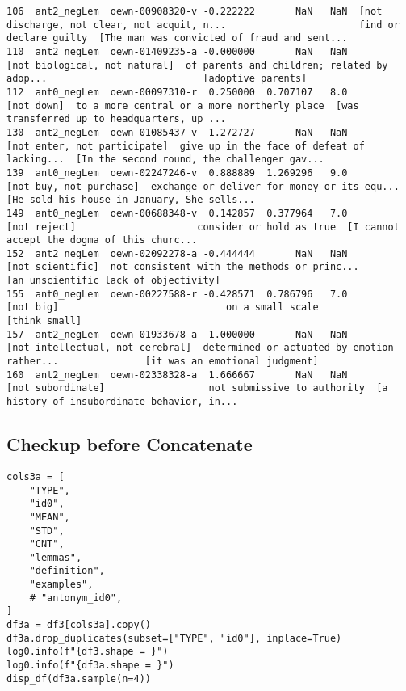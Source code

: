 \documentclass[a4paper,10pt,onecolumn,oneside,openright]{article}
\begin{document}
\begin{verbatim}
106  ant2_negLem  oewn-00908320-v -0.222222       NaN   NaN  [not discharge, not clear, not acquit, n...                       find or declare guilty  [The man was convicted of fraud and sent...
110  ant2_negLem  oewn-01409235-a -0.000000       NaN   NaN                [not biological, not natural]  of parents and children; related by adop...                           [adoptive parents]
112  ant0_negLem  oewn-00097310-r  0.250000  0.707107   8.0                                   [not down]  to a more central or a more northerly place  [was transferred up to headquarters, up ...
130  ant2_negLem  oewn-01085437-v -1.272727       NaN   NaN                 [not enter, not participate]  give up in the face of defeat of lacking...  [In the second round, the challenger gav...
139  ant0_negLem  oewn-02247246-v  0.888889  1.269296   9.0                      [not buy, not purchase]  exchange or deliver for money or its equ...  [He sold his house in January, She sells...
149  ant0_negLem  oewn-00688348-v  0.142857  0.377964   7.0                                 [not reject]                     consider or hold as true  [I cannot accept the dogma of this churc...
152  ant2_negLem  oewn-02092278-a -0.444444       NaN   NaN                             [not scientific]  not consistent with the methods or princ...        [an unscientific lack of objectivity]
155  ant0_negLem  oewn-00227588-r -0.428571  0.786796   7.0                                    [not big]                             on a small scale                                [think small]
157  ant2_negLem  oewn-01933678-a -1.000000       NaN   NaN             [not intellectual, not cerebral]  determined or actuated by emotion rather...               [it was an emotional judgment]
160  ant2_negLem  oewn-02338328-a  1.666667       NaN   NaN                            [not subordinate]                  not submissive to authority  [a history of insubordinate behavior, in...
\end{verbatim}

\subsection{Checkup before Concatenate}
\label{sec:org5ecaf8d}
\begin{verbatim}
cols3a = [
    "TYPE",
    "id0",
    "MEAN",
    "STD",
    "CNT",
    "lemmas",
    "definition",
    "examples",
    # "antonym_id0",
]
df3a = df3[cols3a].copy()
df3a.drop_duplicates(subset=["TYPE", "id0"], inplace=True)
log0.info(f"{df3.shape = }")
log0.info(f"{df3a.shape = }")
disp_df(df3a.sample(n=4))
\end{verbatim}
\end{document}
